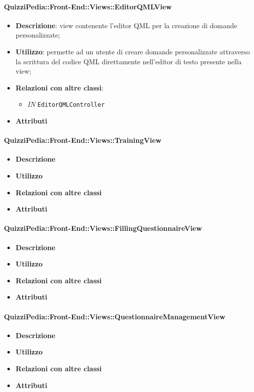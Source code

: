 \paragraph{QuizziPedia::Front-End::Views::EditorQMLView}
\begin{itemize}
	\item \textbf{Descrizione}: view contenente l'editor QML per la creazione di domande personalizzate;
	\item \textbf{Utilizzo}: permette ad un utente di creare domande personalizzate attraverso la scrittura del codice QML direttamente nell'editor di testo presente nella view;
	\item \textbf{Relazioni con altre classi}:
	\begin{itemize}
		\item \textit{IN} \texttt{EditorQMLController} \\
	\end{itemize}
	\item \textbf{Attributi}
\end{itemize}

\paragraph{QuizziPedia::Front-End::Views::TrainingView}
\begin{itemize}
	\item \textbf{Descrizione}
	\item \textbf{Utilizzo}
	\item \textbf{Relazioni con altre classi}
	\item \textbf{Attributi}
\end{itemize}

\paragraph{QuizziPedia::Front-End::Views::FillingQuestionnaireView}
\begin{itemize}
	\item \textbf{Descrizione}
	\item \textbf{Utilizzo}
	\item \textbf{Relazioni con altre classi}
	\item \textbf{Attributi}
\end{itemize}

\paragraph{QuizziPedia::Front-End::Views::QuestionnaireManagementView}
\begin{itemize}
	\item \textbf{Descrizione}
	\item \textbf{Utilizzo}
	\item \textbf{Relazioni con altre classi}
	\item \textbf{Attributi}
\end{itemize}

